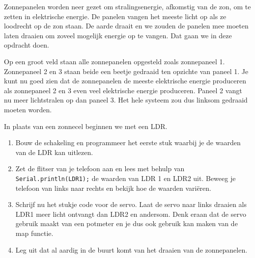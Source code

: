 \documentclass{arduino}
\begin{document}
Zonnepanelen worden neer gezet om stralingsenergie, afkomstig van de zon, om te zetten in elektrische energie. De panelen vangen het meeste licht op als ze loodrecht op de zon staan. De aarde draait en we zouden de panelen mee moeten laten draaien om zoveel mogelijk energie op te vangen. Dat gaan we in deze opdracht doen.

Op een groot veld staan alle zonnepanelen opgesteld zoals zonnepaneel 1. Zonnepaneel 2 en 3 staan beide een beetje gedraaid ten opzichte van paneel 1. Je kunt nu goed zien dat de zonnepanelen de meeste elektrische energie produceren als zonnepaneel 2 en 3 even veel elektrische energie produceren. Paneel 2 vangt nu meer lichtstralen op dan paneel 3. Het hele systeem zou dus linksom gedraaid moeten worden.

\newpage

In plaats van een zonnecel beginnen we met een LDR.

\begin{enumerate}[label={\alph*})]
\item Bouw de schakeling en programmeer het eerste stuk waarbij je de waarden van de LDR kan uitlezen.

\item Zet de flitser van je telefoon aan en lees met behulp van \lstinline{Serial.println(LDR1);} de waarden van LDR 1 en LDR2 uit. Beweeg je telefoon van links naar rechts en bekijk hoe de waarden variëren.

\item Schrijf nu het stukje code voor de servo. Laat de servo naar links draaien als LDR1 meer licht ontvangt dan LDR2 en andersom. Denk eraan dat de servo gebruik maakt van een potmeter en je dus ook gebruik kan maken van de map functie.

\item Leg uit dat al aardig in de buurt komt van het draaien van de zonnepanelen.
\end{enumerate}
\end{document}
